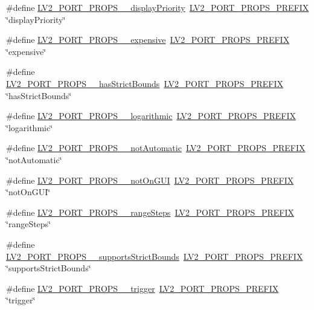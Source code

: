 \begin{DoxyCompactItemize}
\#define \hyperlink{port-props_8h_a935fa5d30f16884c95b23bef9b4c16ca}{L\+V2\+\_\+\+P\+O\+R\+T\+\_\+\+P\+R\+O\+P\+S\+\_\+\+\_\+display\+Priority}~\hyperlink{port-props_8h_ab06a532dc01863154fb741425a78f45e}{L\+V2\+\_\+\+P\+O\+R\+T\+\_\+\+P\+R\+O\+P\+S\+\_\+\+P\+R\+E\+F\+IX} \char`\"{}display\+Priority\char`\"{}
\item 
\#define \hyperlink{port-props_8h_a9fe0f6806b891042998127bd4665b4c9}{L\+V2\+\_\+\+P\+O\+R\+T\+\_\+\+P\+R\+O\+P\+S\+\_\+\+\_\+expensive}~\hyperlink{port-props_8h_ab06a532dc01863154fb741425a78f45e}{L\+V2\+\_\+\+P\+O\+R\+T\+\_\+\+P\+R\+O\+P\+S\+\_\+\+P\+R\+E\+F\+IX} \char`\"{}expensive\char`\"{}
\item 
\#define \hyperlink{port-props_8h_ac56f6a35a6ea58a7cff75a6cce61dec9}{L\+V2\+\_\+\+P\+O\+R\+T\+\_\+\+P\+R\+O\+P\+S\+\_\+\+\_\+has\+Strict\+Bounds}~\hyperlink{port-props_8h_ab06a532dc01863154fb741425a78f45e}{L\+V2\+\_\+\+P\+O\+R\+T\+\_\+\+P\+R\+O\+P\+S\+\_\+\+P\+R\+E\+F\+IX} \char`\"{}has\+Strict\+Bounds\char`\"{}
\item 
\#define \hyperlink{port-props_8h_aee003259ed882f5b6ec83647d497c3a7}{L\+V2\+\_\+\+P\+O\+R\+T\+\_\+\+P\+R\+O\+P\+S\+\_\+\+\_\+logarithmic}~\hyperlink{port-props_8h_ab06a532dc01863154fb741425a78f45e}{L\+V2\+\_\+\+P\+O\+R\+T\+\_\+\+P\+R\+O\+P\+S\+\_\+\+P\+R\+E\+F\+IX} \char`\"{}logarithmic\char`\"{}
\item 
\#define \hyperlink{port-props_8h_a10fd1174695458460d374274a2092f26}{L\+V2\+\_\+\+P\+O\+R\+T\+\_\+\+P\+R\+O\+P\+S\+\_\+\+\_\+not\+Automatic}~\hyperlink{port-props_8h_ab06a532dc01863154fb741425a78f45e}{L\+V2\+\_\+\+P\+O\+R\+T\+\_\+\+P\+R\+O\+P\+S\+\_\+\+P\+R\+E\+F\+IX} \char`\"{}not\+Automatic\char`\"{}
\item 
\#define \hyperlink{port-props_8h_a58d4f4b9ed157610e433df4d84f9cf06}{L\+V2\+\_\+\+P\+O\+R\+T\+\_\+\+P\+R\+O\+P\+S\+\_\+\+\_\+not\+On\+G\+UI}~\hyperlink{port-props_8h_ab06a532dc01863154fb741425a78f45e}{L\+V2\+\_\+\+P\+O\+R\+T\+\_\+\+P\+R\+O\+P\+S\+\_\+\+P\+R\+E\+F\+IX} \char`\"{}not\+On\+G\+UI\char`\"{}
\item 
\#define \hyperlink{port-props_8h_a2cc6c1537a6ee64cf950ca330db8a27a}{L\+V2\+\_\+\+P\+O\+R\+T\+\_\+\+P\+R\+O\+P\+S\+\_\+\+\_\+range\+Steps}~\hyperlink{port-props_8h_ab06a532dc01863154fb741425a78f45e}{L\+V2\+\_\+\+P\+O\+R\+T\+\_\+\+P\+R\+O\+P\+S\+\_\+\+P\+R\+E\+F\+IX} \char`\"{}range\+Steps\char`\"{}
\item 
\#define \hyperlink{port-props_8h_a609e7e1c6f5e9d2697670e17508b392a}{L\+V2\+\_\+\+P\+O\+R\+T\+\_\+\+P\+R\+O\+P\+S\+\_\+\+\_\+supports\+Strict\+Bounds}~\hyperlink{port-props_8h_ab06a532dc01863154fb741425a78f45e}{L\+V2\+\_\+\+P\+O\+R\+T\+\_\+\+P\+R\+O\+P\+S\+\_\+\+P\+R\+E\+F\+IX} \char`\"{}supports\+Strict\+Bounds\char`\"{}
\item 
\#define \hyperlink{port-props_8h_a580d9ea28cfe9cd9bdf4ace6e0abb4c4}{L\+V2\+\_\+\+P\+O\+R\+T\+\_\+\+P\+R\+O\+P\+S\+\_\+\+\_\+trigger}~\hyperlink{port-props_8h_ab06a532dc01863154fb741425a78f45e}{L\+V2\+\_\+\+P\+O\+R\+T\+\_\+\+P\+R\+O\+P\+S\+\_\+\+P\+R\+E\+F\+IX} \char`\"{}trigger\char`\"{}
\end{DoxyCompactItemize}


